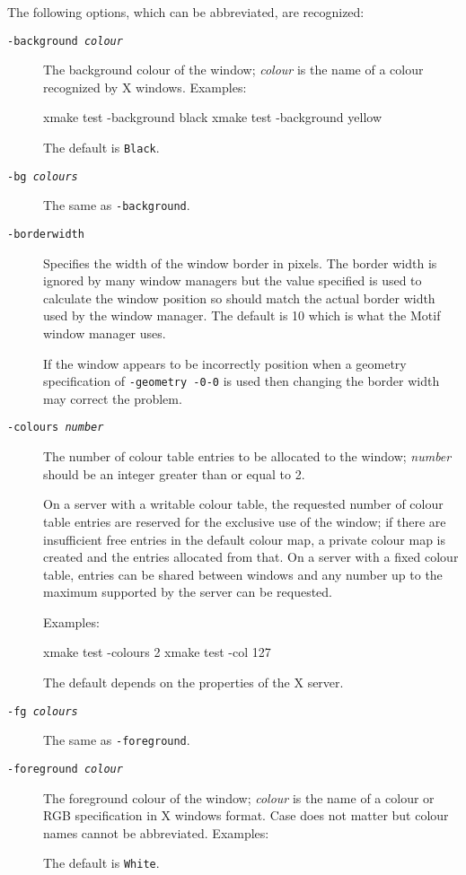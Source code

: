 \documentclass[twoside,11pt,nolof]{starlink}
\begin{document}
The following options, which can be abbreviated, are recognized:
\begin{description}

\item[\texttt{-background \emph{colour}}] The background colour of the window; \emph{colour} is the name of a colour recognized by X windows. Examples:
\begin{terminalv}
xmake test -background black
xmake test -background yellow
\end{terminalv}
The default is \texttt{Black}.

\item[\texttt{-bg \emph{colours}}] The same as \texttt{-background}.

\item[\texttt{-borderwidth}] Specifies the width of the window border in
pixels. The
border width is ignored by many window managers but the value specified
is used to calculate the window position so should match the actual
border width used by the window manager. The default is 10 which is what
the Motif window manager uses.

If the window appears to
be incorrectly position when a geometry specification of \texttt{-geometry
-0-0} is used then changing the border width may correct the problem.

\item[\texttt{-colours \emph{number}}] The number of colour table entries to be
allocated to the window; \emph{number} should be an integer greater than or
equal to 2.

On a server with a writable colour table, the requested number of colour table
entries are reserved for the exclusive use of the window; if there are
insufficient free entries in the default colour map, a private colour map
is created and the entries allocated from that.
On a server with a fixed colour table, entries can
be shared between windows and any number up to the maximum supported by the
server can be requested.

Examples:
\begin{terminalv}
xmake test -colours 2
xmake test -col 127
\end{terminalv}
The default depends on the properties of the X server.

\item[\texttt{-fg \emph{colours}}] The same as \texttt{-foreground}.

\item[\texttt{-foreground \emph{colour}}] The foreground colour of the window; \emph{colour} is the name of a colour or RGB specification in X windows format.
Case does not matter but colour names cannot be abbreviated.
Examples:
\begin{terminalv}
xmake test -foreground white
xmake test -foreground SpringGreen
xmake test -foreground #FF00FF}
\end{terminalv}
The default is \texttt{White}.


\end{description}
\end{document}
